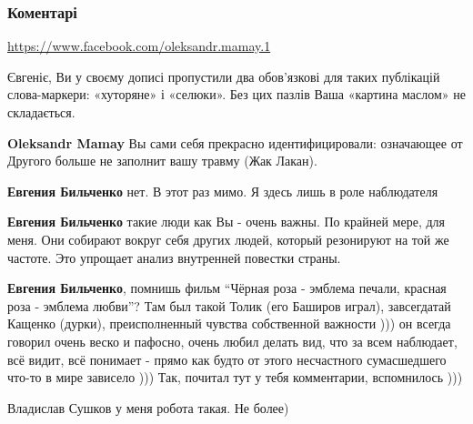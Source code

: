  
 
 
 
 
\subsubsection{Коментарі}
\label{sec:23_06_2021.fb.bilchenko_evgenia.1.odessa_foto.cmt}

\begin{itemize}

\url{https://www.facebook.com/oleksandr.mamay.1}

\begin{itemize}

Євгеніє, Ви у своєму дописі пропустили два обов’язкові для таких публікацій
слова-маркери: «хуторяне» і «селюки». Без цих пазлів Ваша «картина маслом» не
складається.


\textbf{Oleksandr Mamay} Вы сами себя прекрасно идентифицировали: означающее от Другого больше не заполнит вашу травму (Жак Лакан).

\textbf{Евгения Бильченко} нет. В этот раз мимо. Я здесь лишь в роле наблюдателя

\textbf{Евгения Бильченко} такие люди как Вы - очень важны. По крайней мере,
для меня. Они собирают вокруг себя других людей, который резонируют на той же
частоте. Это упрощает анализ внутренней повестки страны.


\textbf{Евгения Бильченко}, помнишь фильм \enquote{Чёрная роза - эмблема печали,
красная роза - эмблема любви}? Там был такой Толик (его Баширов играл),
завсегдатай Кащенко (дурки), преисполненный чувства собственной важности ))) он
всегда говорил очень веско и пафосно, очень любил делать вид, что за всем
наблюдает, всё видит, всё понимает - прямо как будто от этого несчастного
сумасшедшего что-то в мире зависело ))) Так, почитал тут у тебя комментарии,
вспомнилось )))

Владислав Сушков у меня робота такая. Не более)


\end{itemize}
\end{itemize}
